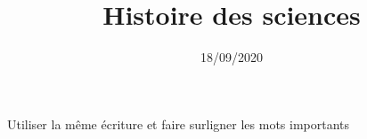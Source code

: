 \documentclass[12pt,a4paper]{article}
\title{Histoire des sciences}
\author{}
\date{18/09/2020}
\begin{document}
\maketitle

Utiliser la même écriture et faire surligner les mots importants
\end{document}
